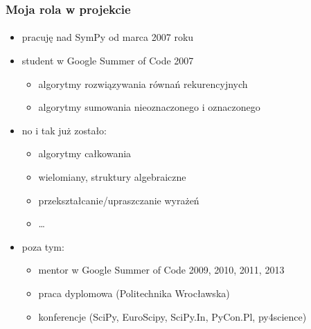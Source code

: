 \documentclass[10pt]{beamer}
\begin{document}
\begin{frame}
    \frametitle{Moja rola w projekcie}
    \framesubtitle{}

    \begin{itemize}
        \item pracuję nad SymPy od marca 2007 roku
        \item student w Google Summer of Code 2007
            \begin{itemize}
                \item algorytmy rozwiązywania równań rekurencyjnych
                \item algorytmy sumowania nieoznaczonego i oznaczonego
            \end{itemize}
        \item no i tak już zostało:
            \begin{itemize}
                \item algorytmy całkowania
                \item wielomiany, struktury algebraiczne
                \item przekształcanie/upraszczanie wyrażeń
                \item \ldots
            \end{itemize}
        \item poza tym:
            \begin{itemize}
                \item mentor w Google Summer of Code 2009, 2010, 2011, 2013
                \item praca dyplomowa (Politechnika Wrocławska)
                \item konferencje (SciPy, EuroScipy, SciPy.In, PyCon.Pl, py4science)
            \end{itemize}
    \end{itemize}
\end{frame}
\end{document}
